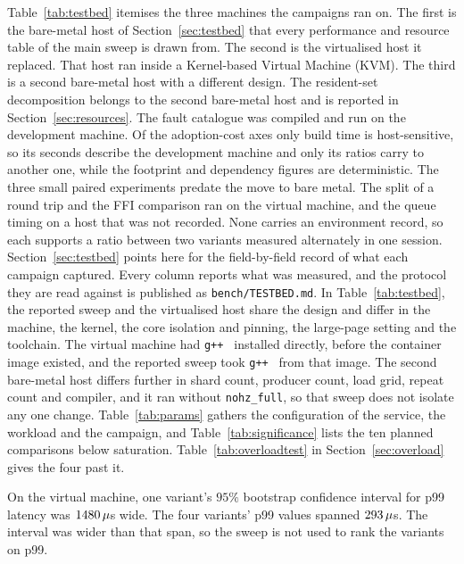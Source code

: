 \documentclass[english,oneside,a4paper,censored,csm,software-track-2020]{HYthesisML}
\begin{document}
\backmatter
\begin{appendices}

Table~\ref{tab:testbed} itemises the three machines the campaigns ran on. The first is the
bare-metal host of Section~\ref{sec:testbed} that every performance and resource table of the
main sweep is drawn from. The second is the virtualised host it replaced. That host ran inside a
Kernel-based Virtual Machine (KVM). The third is a second
bare-metal host with a different design. The resident-set decomposition belongs to the
second bare-metal host and is reported in Section~\ref{sec:resources}. The fault catalogue was
compiled and run on the development machine. Of the
adoption-cost axes only build time is host-sensitive, so its seconds describe the development
machine and only its ratios carry to another one, while the footprint and dependency figures
are deterministic. The three small paired
experiments predate the move to bare metal. The split of a round trip and the FFI comparison
ran on the virtual machine, and the queue timing on a host that was not recorded. None carries
an environment record, so each supports a ratio between two variants measured alternately in
one session. Section~\ref{sec:testbed} points
here for the field-by-field record of what each campaign captured. Every column reports what was
measured, and the protocol they are read against is published as \texttt{bench/TESTBED.md}.
In Table~\ref{tab:testbed}, the reported sweep and the virtualised host share the design and
differ in the machine, the kernel, the core isolation and pinning, the large-page setting and
the toolchain. The virtual machine had \texttt{g++~\GuestGpp} installed directly, before the
container image existed, and the reported sweep took \texttt{g++~\MainGpp} from that image.
The second bare-metal host differs further in shard count, producer count, load grid, repeat
count and compiler, and it ran without \texttt{nohz\_full}, so that sweep does not isolate any
one change. Table~\ref{tab:params} gathers
the configuration of the service, the workload and the campaign, and
Table~\ref{tab:significance} lists the ten planned comparisons below saturation.
Table~\ref{tab:overloadtest} in Section~\ref{sec:overload} gives the four past it.

On the virtual machine, one variant's $95\%$ bootstrap confidence interval for p99
latency was $1480\,\mu$s wide. The four variants' p99 values spanned
$293\,\mu$s. The interval was wider than that span, so the sweep is not
used to rank the variants on p99.


\end{appendices}
\end{document}
